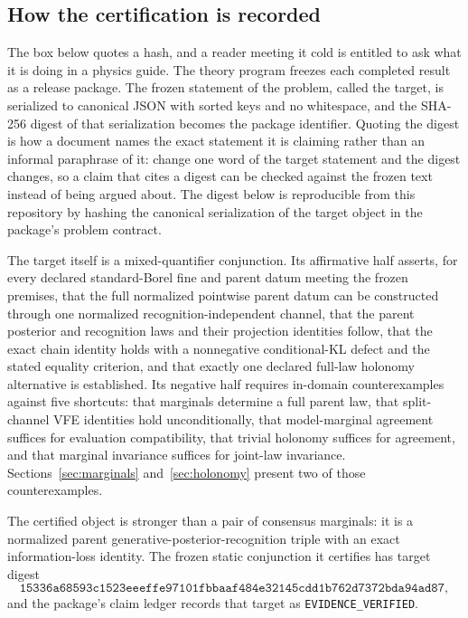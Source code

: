 \documentclass[11pt,letterpaper]{article}
\begin{document}
\subsection{How the certification is recorded}

The box below quotes a hash, and a reader meeting it cold is entitled to ask what it is doing in a physics guide. The theory program freezes each completed result as a release package. The frozen statement of the problem, called the target, is serialized to canonical JSON with sorted keys and no whitespace, and the SHA-256 digest of that serialization becomes the package identifier. Quoting the digest is how a document names the exact statement it is claiming rather than an informal paraphrase of it: change one word of the target statement and the digest changes, so a claim that cites a digest can be checked against the frozen text instead of being argued about. The digest below is reproducible from this repository by hashing the canonical serialization of the target object in the package's problem contract.

The target itself is a mixed-quantifier conjunction. Its affirmative half asserts, for every declared standard-Borel fine and parent datum meeting the frozen premises, that the full normalized pointwise parent datum can be constructed through one normalized recognition-independent channel, that the parent posterior and recognition laws and their projection identities follow, that the exact chain identity holds with a nonnegative conditional-KL defect and the stated equality criterion, and that exactly one declared full-law holonomy alternative is established. Its negative half requires in-domain counterexamples against five shortcuts: that marginals determine a full parent law, that split-channel VFE identities hold unconditionally, that model-marginal agreement suffices for evaluation compatibility, that trivial holonomy suffices for agreement, and that marginal invariance suffices for joint-law invariance. Sections~\ref{sec:marginals} and~\ref{sec:holonomy} present two of those counterexamples.

\begin{provedbox}
The certified object is stronger than a pair of consensus marginals: it is a normalized parent generative-posterior-recognition triple with an exact information-loss identity. The frozen static conjunction it certifies has target digest
\[
\texttt{15336a68593c1523eeeffe97101fbbaaf484e32145cdd1b762d7372bda94ad87},
\]
and the package's claim ledger records that target as \texttt{EVIDENCE\_VERIFIED}.
\end{provedbox}
\end{document}
